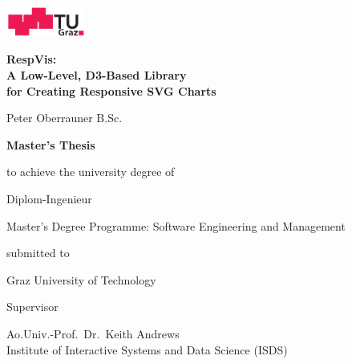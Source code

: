 \begin{center}
    \includegraphics[height=1cm]{diagrams/tugraz-logo.pdf}

    \vspace{2cm}

    \begin{spacing}{1.1}
        \huge\sffamily\bfseries
        RespVis:\\
        A Low-Level, D3-Based Library\\
        for Creating Responsive SVG Charts
    \end{spacing}

    \vspace{2cm}

    {\Large\sffamily Peter Oberrauner B.Sc.}

    \vspace{2cm}

    {\Large\sffamily\bfseries Master's Thesis}

    \vspace{5mm}

    {\small\sffamily to achieve the university degree of}

    \vspace{5mm}

    {\normalsize\sffamily Diplom-Ingenieur}  %

    \vspace{5mm}

    {\normalsize\sffamily
        Master's Degree Programme: Software Engineering and Management
    }


    \vspace{1cm}

    {\small\sffamily submitted to}

    \vspace{5mm}

    {\large\sffamily Graz University of Technology}



    \vspace{1cm}

    {\small\sffamily Supervisor}

    \vspace{5mm}

    {\normalsize\sffamily
        Ao.Univ.-Prof.\ Dr.\ Keith Andrews \\
        Institute of Interactive Systems and Data Science (ISDS)
    }



\end{center}
